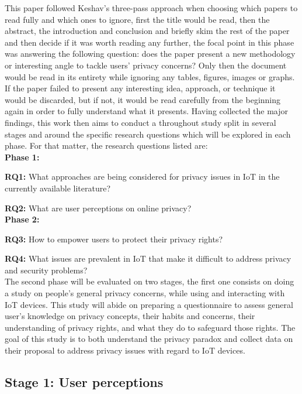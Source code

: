 \documentclass[manuscript,screen,review,natbib=false]{acmart}
\begin{document}
This paper followed Keshav's three-pass approach \cite{KeshavHow} when choosing
which papers to read fully and which ones to ignore, first the title would
be read, then the abstract, the introduction and conclusion and briefly
skim the rest of the paper and then decide if it was worth reading any further,
the focal point in this phase was answering the following question: does
the paper present a new methodology or interesting angle to tackle users'
privacy concerns? Only then the document would be read in its entirety while
ignoring any tables, figures, images or graphs. If the paper failed to present
any interesting idea, approach, or technique it would be discarded, but
if not, it would be read carefully from the beginning again in order to
fully understand what it presents. Having collected the major findings,
this work then aims to conduct a throughout study split in several stages
and around the specific research questions which will be explored in each
phase. For that matter, the research questions listed are: \\

\textbf{Phase 1:}

\textbf{RQ1:} What approaches are being considered for privacy issues in
IoT in the currently available literature?

\textbf{RQ2:} What are user perceptions on online privacy? \\

\textbf{Phase 2:}

\textbf{RQ3:}
How to empower users to protect their privacy rights?

\textbf{RQ4:} What issues are prevalent in IoT that make it difficult to
address privacy and security problems? \\

The second phase will be evaluated on two stages, the first one consists
on doing a study on people's general privacy concerns, while using and interacting
with IoT devices. This study will abide on preparing a questionnaire to
assess general user's knowledge on privacy concepts, their habits and concerns,
their understanding of privacy rights, and what they do to safeguard those
rights. The goal of this study is to both understand the privacy paradox
and collect data on their proposal to address privacy issues with regard
to IoT devices.

\subsection{Stage 1: User perceptions}
\end{document}
